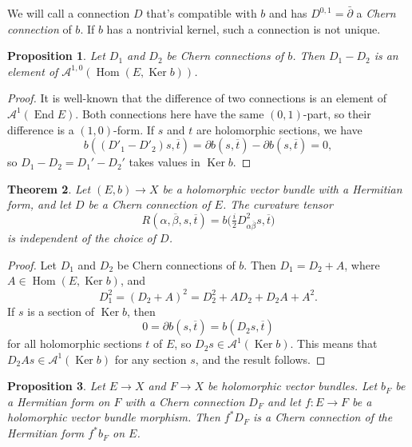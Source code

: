 \documentclass[10pt,a4paper]{article}
\newtheorem{theo}{Theorem}[section]
\newtheorem{prop}[theo]{Proposition}
\newtheorem*{proof}{Proof}
\newcommand{\cc}[1]{\mathcal{#1}}
\def\ov#1{\overline{#1}}
\DeclareMathOperator{\Ker}{Ker}
\DeclareMathOperator{\End}{End}
\DeclareMathOperator{\Hom}{Hom}
\begin{document}
We will call a connection $D$ that's compatible with $b$ and has $D^{0,1} = \bar\partial$ a \emph{Chern connection} of $b$. If $b$ has a nontrivial kernel, such a connection is not unique.


\begin{prop}
Let $D_1$ and $D_2$ be Chern connections of $b$. Then $D_1 - D_2$ is an element of $\cc A^{1,0}(\Hom(E, \Ker b))$.
\end{prop}

\begin{proof}
It is well-known that the difference of two connections is an element of $\cc A^1(\End E)$. Both connections here have the same $(0,1)$-part, so their difference is a $(1,0)$-form. If $s$ and $t$ are holomorphic sections, we have
\[
b((D'_1 - D'_2)s, \ov t)
= \partial b(s, \ov t) - \partial b(s, \ov t) = 0,
\]
so $D_1 - D_2 = D_1' - D_2'$ takes values in $\Ker b$.
\end{proof}


\begin{theo}
Let $(E, b) \to X$ be a holomorphic vector bundle with a Hermitian form, and let $D$ be a Chern connection of $E$. The curvature tensor
\[
R(\alpha,\ov\beta,s, \ov t)
= b\bigl(\tfrac i2 D^2_{\alpha\ov\beta}s, \ov t\bigr)
\]
is independent of the choice of $D$.
\end{theo}


\begin{proof}
Let $D_1$ and $D_2$ be Chern connections of $b$. Then $D_1 = D_2 + A$, where $A \in \Hom(E, \Ker b)$, and
\[
D_1^2
= (D_2 + A)^2
= D_2^2 + A D_2 + D_2 A + A^2.
\]
If $s$ is a section of $\Ker b$, then
\[
0
= \partial b(s, \ov t)
= b(D_2s, \ov t)
\]
for all holomorphic sections $t$ of $E$, so $D_2 s \in \cc A^1(\Ker b)$. This means that $D_2A s \in \cc A^1(\Ker b)$ for any section $s$, and the result follows.
\end{proof}


\begin{prop}
Let $E \to X$ and $F \to X$ be holomorphic vector bundles. Let $b_F$ be a Hermitian form on $F$ with a Chern connection $D_F$ and let $f : E \to F$ be a holomorphic vector bundle morphism. Then $f^*D_F$ is a Chern connection of the Hermitian form $f^*b_F$ on $E$.
\end{prop}







\end{document}
